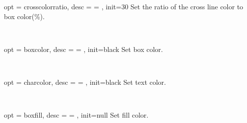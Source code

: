 \documentclass[full]{l3doc}
\begin{document}
\begin{documentation}
\bigskip

\begin{option}{ opt = crosscolorratio, desc = {= }, init=30 }
  Set the ratio of the cross line color to box color(\%).
\end{option}\\
\begin{SideBySideExample}[frame=single,numbers=left,xrightmargin=.38\linewidth,gobble=2]
  \centering
  \quad
\end{SideBySideExample}

\bigskip

\begin{option}{ opt = boxcolor, desc = {= }, init=black }
  Set box color.
\end{option}\\
\begin{SideBySideExample}[frame=single,numbers=left,xrightmargin=.50\linewidth,gobble=2]
  \centering
  \quad
  \quad
\end{SideBySideExample}

\bigskip

\begin{option}{ opt = charcolor, desc = {= }, init=black }
  Set text color.
\end{option}\\
\begin{SideBySideExample}[frame=single,numbers=left,xrightmargin=.45\linewidth,gobble=2]
  \centering
  \quad
  \quad
\end{SideBySideExample}

\bigskip

\begin{option}{ opt = boxfill, desc = {= }, init=null }
  Set fill color.
\end{option}\\
\begin{SideBySideExample}[frame=single,numbers=left,xrightmargin=.45\linewidth,gobble=2]
  \centering
  \quad
  \quad
\end{SideBySideExample}


\end{documentation}
\end{document}
